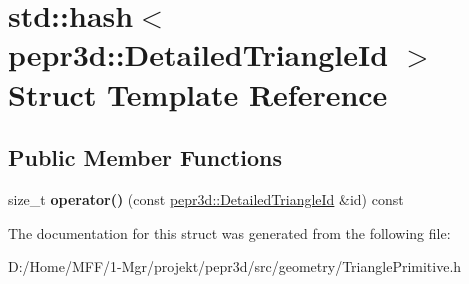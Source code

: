 \hypertarget{structstd_1_1hash_3_01pepr3d_1_1_detailed_triangle_id_01_4}{}\section{std\+::hash$<$ pepr3d\+::Detailed\+Triangle\+Id $>$ Struct Template Reference}
\label{structstd_1_1hash_3_01pepr3d_1_1_detailed_triangle_id_01_4}
\subsection*{Public Member Functions}
\begin{DoxyCompactItemize}
\item 
\mbox{\label{structstd_1_1hash_3_01pepr3d_1_1_detailed_triangle_id_01_4_a0c16ac520b8a68df45516c16eaf00aaa}} 
size\+\_\+t {\bfseries operator()} (const \mbox{\hyperlink{structpepr3d_1_1_detailed_triangle_id}{pepr3d\+::\+Detailed\+Triangle\+Id}} \&id) const
\end{DoxyCompactItemize}


The documentation for this struct was generated from the following file\+:\begin{DoxyCompactItemize}
\item 
D\+:/\+Home/\+M\+F\+F/1-\/\+Mgr/projekt/pepr3d/src/geometry/Triangle\+Primitive.\+h\end{DoxyCompactItemize}
